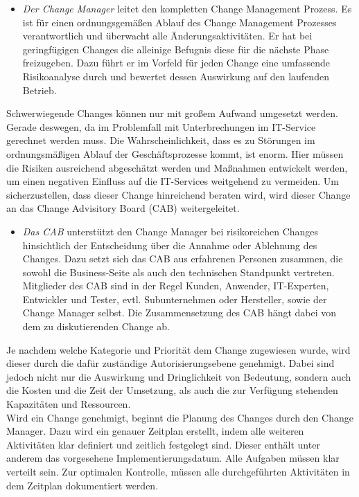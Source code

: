 \begin{itemize}
\vspace{-0.1cm}
	\item \textit{Der Change Manager} leitet den kompletten Change Management Prozess. Es ist für einen ordnungsgemäßen Ablauf des Change Management Prozesses verantwortlich und überwacht alle Änderungsaktivitäten. Er hat bei geringfügigen Changes die alleinige Befugnis diese für die nächste Phase freizugeben. Dazu führt er im Vorfeld für jeden Change eine umfassende Risikoanalyse durch und bewertet dessen Auswirkung auf den laufenden Betrieb. 
\end{itemize}
\vspace{-0.1cm}
Schwerwiegende Changes können nur mit großem Aufwand umgesetzt werden. Gerade deswegen, da im Problemfall mit Unterbrechungen im IT-Service gerechnet werden muss. Die Wahrscheinlichkeit, dass es zu Störungen im ordnungsmäßigen Ablauf der Geschäftsprozesse kommt, ist enorm. Hier müssen die Risiken ausreichend abgeschätzt werden und Maßnahmen entwickelt werden, um einen negativen Einfluss auf die IT-Services weitgehend zu vermeiden. Um sicherzustellen, dass dieser Change hinreichend beraten wird, wird dieser Change an das Change Advisitory Board (CAB) weitergeleitet. 
\begin{itemize}
	\item \textit{Das CAB} unterstützt den Change Manager bei risikoreichen Changes hinsichtlich der Entscheidung über die Annahme oder Ablehnung des Changes. Dazu setzt sich das CAB aus erfahrenen Personen zusammen, die sowohl die Business-Seite als auch den technischen Standpunkt vertreten. Mitglieder des CAB sind in der Regel Kunden, Anwender, IT-Experten, Entwickler und Tester, evtl. Subunternehmen oder Hersteller, sowie der Change Manager selbst. Die Zusammensetzung des CAB hängt dabei von dem zu diskutierenden Change ab. 
\end{itemize}
Je nachdem welche Kategorie und Priorität dem Change zugewiesen wurde, wird dieser durch die dafür zuständige Autorisierungsebene genehmigt. Dabei sind jedoch nicht nur die Auswirkung und Dringlichkeit von Bedeutung, sondern auch die Kosten und die Zeit der Umsetzung, als auch die zur Verfügung stehenden Kapazitäten und Ressourcen. 
\\
Wird ein Change genehmigt, beginnt die Planung des Changes durch den Change Manager. Dazu wird ein genauer Zeitplan erstellt, indem alle weiteren Aktivitäten klar definiert und zeitlich festgelegt sind. Dieser enthält unter anderem das vorgesehene Implementierungsdatum. Alle Aufgaben müssen klar verteilt sein. Zur optimalen Kontrolle, müssen alle durchgeführten Aktivitäten in dem Zeitplan dokumentiert werden.
